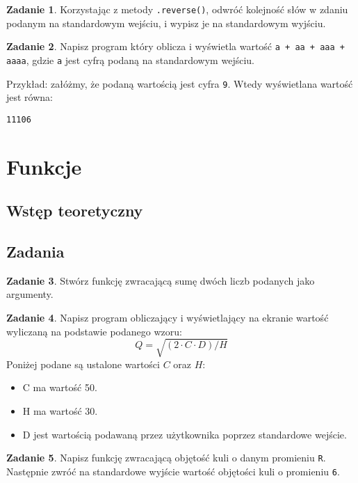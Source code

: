 \documentclass[11pt]{article}
\theoremstyle{definition}
\newtheorem{zadanie}{Zadanie}
\begin{document}
\begin{zadanie}
Korzystając z metody \texttt{.reverse()}, odwróć kolejność słów w zdaniu podanym na standardowym wejściu, i wypisz je na standardowym wyjściu.
\end{zadanie}

\begin{zadanie}
Napisz program który oblicza i wyświetla wartość \texttt{a + aa + aaa + aaaa}, gdzie \texttt{a} jest cyfrą podaną na standardowym wejściu.

Przykład: załóżmy, że podaną wartością jest cyfra \texttt{9}. Wtedy wyświetlana wartość jest równa:
\begin{verbatim}
11106	
\end{verbatim}
\end{zadanie}

\section{Funkcje}
\subsection{Wstęp teoretyczny}
\subsection{Zadania}


\begin{zadanie}
Stwórz funkcję zwracającą sumę dwóch liczb podanych jako argumenty.
\end{zadanie}

\begin{zadanie}
Napisz program obliczający i wyświetlający na ekranie wartość wyliczaną na podstawie podanego wzoru:
$$Q = \sqrt{(2 \cdot C \cdot D)/H}$$
Poniżej podane są ustalone wartości $C$ oraz $H$:
\begin{itemize}
\item C ma wartość 50.
\item H ma wartość 30.
\item D jest wartością podawaną przez użytkownika poprzez standardowe wejście.
\end{itemize}
\end{zadanie}


\begin{zadanie}
Napisz funkcję zwracającą objętość kuli o danym promieniu \texttt{R}. Następnie zwróć na standardowe wyjście wartość objętości kuli o promieniu \texttt{6}.
\end{zadanie}
\end{document}
